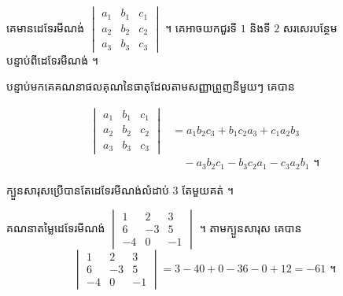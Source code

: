 គេមានដេទែរមីណង់ $\begin{vmatrix} a_1 & b_1 & c_1\\ a_2 & b_2 & c_2\\ a_3 & b_3 & c_3 \end{vmatrix}$ ។ គេអាចយកជួរទី $1$ និងទី $2$ សរសេរបន្ថែមបន្ទាប់ពីដេទែរមីណង់ ។
\begin{center}
\end{center}
បន្ទាប់មកគេគណនាផលគុណនៃធាតុដែលតាមសញ្ញាព្រួញនីមួយៗ គេបាន
\begin{formulaBox}[ក្បួនសារុស]
\[
\begin{aligned}
\begin{vmatrix} a_1 & b_1 & c_1\\ a_2 & b_2 & c_2\\ a_3 & b_3 & c_3 \end{vmatrix} &= a_1b_2c_3 + b_1c_2a_3 + c_1a_2b_3\\
&\quad - a_3b_2c_1 - b_3c_2a_1 - c_3a_2b_1 \text{ ។}
\end{aligned}
\]
\end{formulaBox}
\begin{note}[សម្គាល់]
ក្បួនសារុសប្រើបានតែដេទែរមីណង់លំដាប់ $3$ តែមួយគត់ ។
\end{note}

\begin{example}[ឧទាហរណ៍]
គណនាតម្លៃដេទែរមីណង់ $\begin{vmatrix} 1 & 2 & 3\\ 6 & -3 & 5\\ -4 & 0 & -1 \end{vmatrix}$ ។ តាមក្បួនសារុស គេបាន
\[ \begin{vmatrix} 1 & 2 & 3\\ 6 & -3 & 5\\ -4 & 0 & -1 \end{vmatrix} = 3 - 40 + 0 - 36 - 0 + 12 = -61 \text{ ។} \]
\end{example}

